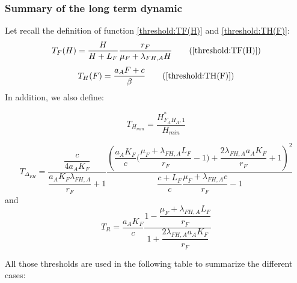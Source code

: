 \documentclass{article}
\newcommand{\lfa}{\lambda_{FH, A}}
\begin{document}
\begin{itemize}
%
%
\end{itemize}


\subsubsection{Summary of the long term dynamic}
Let recall the definition of function \eqref{threshold:TF(H)} and \eqref{threshold:TH(F)}:
\begin{equation}
T_F(H) = \dfrac{H}{H + L_F}\dfrac{r_F}{\mu_F + \lfa H}
\tag{\ref{threshold:TF(H)}}
\end{equation}
\begin{equation}
T_H(F) = \dfrac{a_A F + c }{\beta}
\tag{\ref{threshold:TH(F)}}
\end{equation}
In addition, we also define:

\begin{equation}
T_{H_{min}} = \dfrac{H^*_{F_AH_A, 1}}{H_{min}}
\end{equation}

\begin{equation}
T_{\Delta_{FH}} = \dfrac{\dfrac{c}{4a_A K_F}}{\dfrac{a_A K_F \lfa}{r_F} + 1}\dfrac{\left(\dfrac{a_A K_F}{c} \Big(\dfrac{\mu_F + \lfa L_F}{r_F} - 1\Big)+ \dfrac{2 \lfa a_A K_F}{r_F} + 1 \right)^2}{\dfrac{c+L_F}{c} \dfrac{\mu_F + \lfa c}{r_F} - 1}
\end{equation}
and
\begin{equation}
T_R = \dfrac{a_AK_F}{c} \dfrac{1 - \dfrac{\mu_F + \lfa L_F}{r_F}}{1 + \dfrac{2 \lfa a_AK_F}{r_F}}
\end{equation}

All those thresholds are used in the following table to summarize the different cases:
\end{document}
